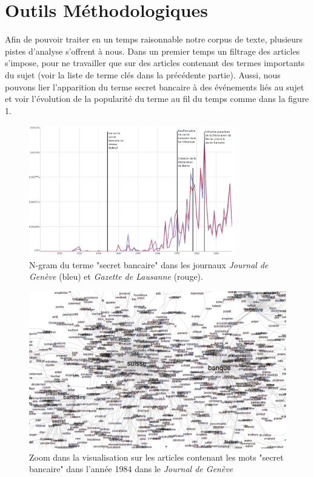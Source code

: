 \documentclass[11pt]{article}
\begin{document}
\section{Outils Méthodologiques}

Afin de pouvoir traiter en un temps raisonnable notre corpus de texte, plusieurs
pistes d’analyse s’offrent à nous. Dans un premier temps un filtrage des
articles s’impose, pour ne travailler que sur des articles contenant des termes
importants du sujet (voir la liste de terme clés dans la précédente partie).
Aussi, nous pouvons lier l'apparition du terme secret bancaire à des événements
liés au sujet et voir l'évolution de la popularité du terme au fil du temps comme dans
la figure 1.

\begin{figure}[!htb]
  \centering
\includegraphics[width=0.8\textwidth]{ngram.png}
\caption{
  N-gram du terme "secret bancaire" dans les journaux \textit{Journal de Genève}
  (bleu) et \textit{Gazette de Lausanne} (rouge).
}
\end{figure}

\begin{figure}[!htb]
  \centering
  \includegraphics[width=1.0\textwidth]{reduced.png}
  \caption{Zoom dans la visualisation sur les articles contenant les mots "secret 
bancaire" dans l'année 1984 dans le \textit{Journal de Genève}}
\end{figure}
\end{document}
